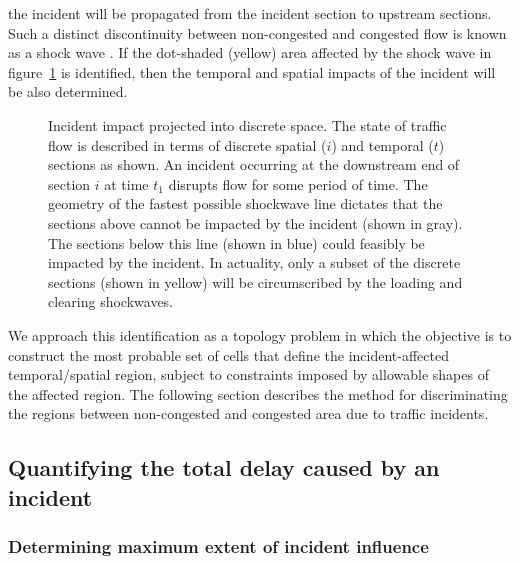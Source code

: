 \documentclass[12pt]{report}
\newcommand{\inputTikZ}[1]{%
    \begin{singlespace}
    \end{singlespace}
  }
\newcommand{\inputTikZ}[1]{%
    \begin{singlespace}
    \beginpgfgraphicnamed{#1-external}%
    \endpgfgraphicnamed%
    \end{singlespace}
  }
\newcounter{time}
\newcounter{space}
\begin{document}
the incident will be propagated from the incident section to upstream
sections.  Such a distinct discontinuity between non-congested and
congested flow is known as a shock wave
\citep{lighthill55:_kinem_waves}.  If the dot-shaded (yellow) area
affected by the shock wave in figure~\ref{fig:incident-impact} is
identified, then the temporal and spatial impacts of the incident will
be also determined. 
\begin{figure}[tbp]
  \begin{center}
    \inputTikZ{figs/time-space-incident-schematic}
    \caption[Incident impact projected into discrete space]{Incident
      impact projected into discrete space.  The state of traffic flow
      is described in terms of discrete spatial ($i$) and temporal ($t$)
      sections as shown.  An incident occurring at the downstream end of
      section $i$ at time $t_1$ disrupts flow for some period of time.
      The geometry of the fastest possible shockwave line dictates that
      the sections above cannot be impacted by the incident (shown in
      gray).  The sections below this line (shown in blue) could
      feasibly be impacted by the incident.  In actuality, only a subset
      of the discrete sections (shown in yellow) will be circumscribed
      by the loading and clearing shockwaves.}
    \label{fig:incident-impact}
  \end{center}
\end{figure}
We approach this identification as a topology problem in which the
objective is to construct the most probable set of cells that define
the incident-affected temporal/spatial region, subject to constraints
imposed by allowable shapes of the affected region. The following
section describes the method for discriminating the regions between
non-congested and congested area due to traffic incidents.


\subsection{Quantifying the total delay caused by an incident}
\label{sec:delay-calc}

\subsubsection{Determining maximum extent of incident influence}
\label{sec:max-infl}
\end{document}
